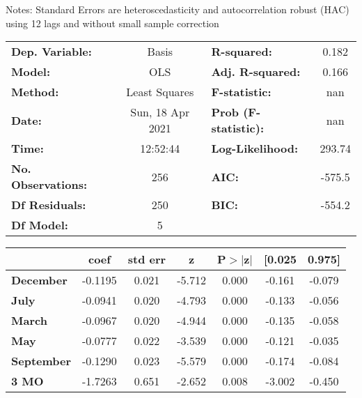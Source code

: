 Notes: \newline
 [1] Standard Errors are heteroscedasticity and autocorrelation robust (HAC) using 12 lags and without small sample correction
\begin{center}
\begin{tabular}{lclc}
\toprule
\textbf{Dep. Variable:}    &      Basis       & \textbf{  R-squared:         } &     0.182   \\
\textbf{Model:}            &       OLS        & \textbf{  Adj. R-squared:    } &     0.166   \\
\textbf{Method:}           &  Least Squares   & \textbf{  F-statistic:       } &       nan   \\
\textbf{Date:}             & Sun, 18 Apr 2021 & \textbf{  Prob (F-statistic):} &      nan    \\
\textbf{Time:}             &     12:52:44     & \textbf{  Log-Likelihood:    } &    293.74   \\
\textbf{No. Observations:} &         256      & \textbf{  AIC:               } &    -575.5   \\
\textbf{Df Residuals:}     &         250      & \textbf{  BIC:               } &    -554.2   \\
\textbf{Df Model:}         &           5      & \textbf{                     } &             \\
\bottomrule
\end{tabular}
\begin{tabular}{lcccccc}
                   & \textbf{coef} & \textbf{std err} & \textbf{z} & \textbf{P$> |$z$|$} & \textbf{[0.025} & \textbf{0.975]}  \\
\midrule
\textbf{December}  &      -0.1195  &        0.021     &    -5.712  &         0.000        &       -0.161    &       -0.079     \\
\textbf{July}      &      -0.0941  &        0.020     &    -4.793  &         0.000        &       -0.133    &       -0.056     \\
\textbf{March}     &      -0.0967  &        0.020     &    -4.944  &         0.000        &       -0.135    &       -0.058     \\
\textbf{May}       &      -0.0777  &        0.022     &    -3.539  &         0.000        &       -0.121    &       -0.035     \\
\textbf{September} &      -0.1290  &        0.023     &    -5.579  &         0.000        &       -0.174    &       -0.084     \\
\textbf{3 MO}      &      -1.7263  &        0.651     &    -2.652  &         0.008        &       -3.002    &       -0.450     \\

\end{tabular}
\end{center}
